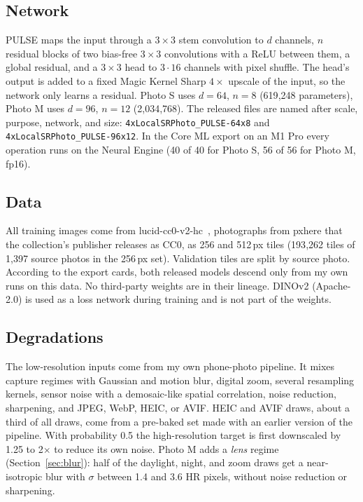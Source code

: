 \documentclass[conference]{IEEEtran}
\begin{document}
\subsection{Network}
PULSE maps the input through a $3\times3$ stem convolution to $d$ channels, $n$ residual blocks of two bias-free
$3\times3$ convolutions with a ReLU between them, a global residual, and a $3\times3$ head to $3\cdot16$ channels
with pixel shuffle. The head's output is added to a fixed Magic Kernel Sharp $4\times$ upscale of the input, so the
network only learns a residual. Photo S uses $d=64$, $n=8$ (619{,}248 parameters), Photo M uses $d=96$, $n=12$
(2{,}034{,}768). The released files are named after scale, purpose, network, and size:
\texttt{4xLocalSRPhoto\_PULSE-64x8} and \texttt{4xLocalSRPhoto\_PULSE-96x12}. In the Core ML export on an M1 Pro every operation runs on the Neural Engine (40 of 40 for Photo S, 56
of 56 for Photo M, fp16).

\subsection{Data}
All training images come from lucid-cc0-v2-hc~\cite{lucid}, photographs from pxhere that the collection's publisher
releases as CC0, as 256 and 512\,px tiles (193{,}262 tiles of 1{,}397 source photos in the 256\,px set). Validation
tiles are split by source photo. According to the export cards, both released models descend only from my own runs on
this data. No third-party weights are in their lineage. DINOv2 (Apache-2.0) is used as a loss network during
training and is not part of the weights.

\subsection{Degradations}
The low-resolution inputs come from my own phone-photo pipeline. It mixes capture regimes with Gaussian and motion
blur, digital zoom, several resampling kernels, sensor noise with a demosaic-like spatial correlation, noise
reduction, sharpening, and JPEG, WebP, HEIC, or AVIF. HEIC and AVIF draws, about a third of all draws, come from a
pre-baked set made with an earlier version of the pipeline. With probability 0.5 the high-resolution target is first
downscaled by 1.25 to 2$\times$ to reduce its own noise. Photo M adds a \emph{lens} regime (Section~\ref{sec:blur}): half
of the daylight, night, and zoom draws get a near-isotropic blur with $\sigma$ between 1.4 and 3.6 HR pixels, without
noise reduction or sharpening.
\end{document}
